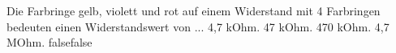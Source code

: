     {Die Farbringe gelb, violett und rot auf einem Widerstand mit 4 Farbringen bedeuten einen Widerstandswert von ...}
    {4,7 kOhm.}
    {47 kOhm.}
    {470 kOhm.}
    {4,7 MOhm.}
    {false}{false}